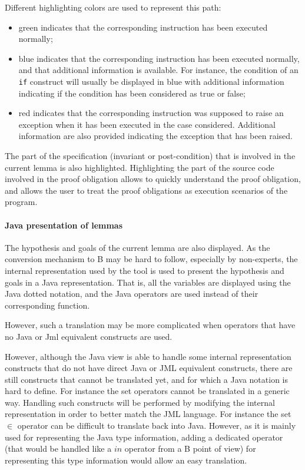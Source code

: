Different highlighting colors are used to represent this path:
\begin{itemize}
\item green indicates that the corresponding instruction has been
   executed normally;
\item blue indicates that the corresponding instruction has been
   executed normally, and that additional information is
   available. For instance, the condition of an \texttt{if} construct will
   usually be displayed in blue with additional information indicating
   if the condition has been considered as true or false;
\item red indicates that the corresponding instruction was supposed to
   raise an exception when it has been executed in the case
   considered.  Additional information are also provided indicating
   the exception that has been raised.
\end{itemize}
The part of the specification (invariant or post-condition) that is
involved in the current lemma is also highlighted.  Highlighting the
part of the source code involved in the proof obligation allows to
quickly understand the proof obligation, and allows the user to treat
the proof obligations as execution scenarios of the program.
\paragraph{Java presentation of lemmas}
The hypothesis and goals of the current lemma are also displayed. As
the conversion mechanism to B may be hard to follow, especially by
non-experts, the internal representation used by the tool is used to
present the hypothesis and goals in a Java representation. That is,
all the variables are displayed using the Java dotted notation, and
the Java operators are used instead of their corresponding function.

However, such a translation may be more complicated when operators that
have no Java or Jml equivalent constructs are used.  


 However, although the Java view is able to handle some internal
 representation constructs that do not have direct Java or JML
 equivalent constructs, there are still constructs that cannot be
 translated yet, and for which a Java notation is hard to define. For
 instance the set operators cannot be translated in a generic way.
 Handling such constructs will be performed by modifying the internal
 representation in order to better match the JML language. For
 instance the set $\in$ operator can be difficult to translate back
 into Java. However, as it is mainly used for representing the Java
 type information, adding a dedicated operator (that would be handled
 like a $in$ operator from a B point of view) for
 representing this type information would allow an easy translation.

